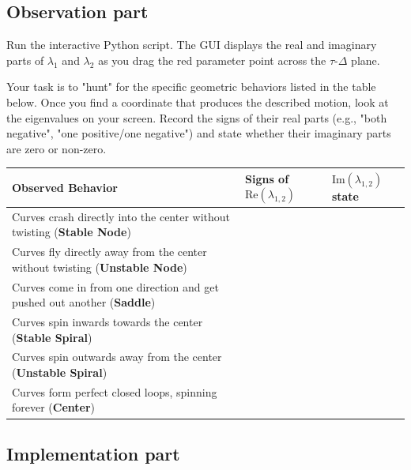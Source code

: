 \documentclass[11pt]{article}
\begin{document}
\subsection*{Observation part}

Run the interactive Python script. The GUI displays the real and imaginary parts of $\lambda_1$ and $\lambda_2$ as you drag the red parameter point across the $\tau$-$\Delta$ plane.


Your task is to "hunt" for the specific geometric behaviors listed in the table below. Once you find a coordinate that produces the described motion, look at the eigenvalues on your screen. Record the signs of their real parts (e.g., "both negative", "one positive/one negative") and state whether their imaginary parts are zero or non-zero.

\begin{center}
\renewcommand{\arraystretch}{2.0}
\begin{tabular}{p{7.5cm} | p{4cm} | p{3.5cm}}
\toprule
\textbf{Observed Behavior} & \textbf{Signs of $\text{Re}(\lambda_{1,2})$} & \textbf{$\text{Im}(\lambda_{1,2})$ state} \\
\midrule
Curves crash directly into the center without twisting (\textbf{Stable Node}) & & \\ \midrule
Curves fly directly away from the center without twisting (\textbf{Unstable Node}) & & \\ \midrule
Curves come in from one direction and get pushed out another (\textbf{Saddle}) & & \\ \midrule
Curves spin inwards towards the center (\textbf{Stable Spiral}) & & \\ \midrule
Curves spin outwards away from the center (\textbf{Unstable Spiral}) & & \\ \midrule
Curves form perfect closed loops, spinning forever (\textbf{Center}) & & \\
\bottomrule
\end{tabular}
\end{center}




\subsection*{Implementation part}
\end{document}

